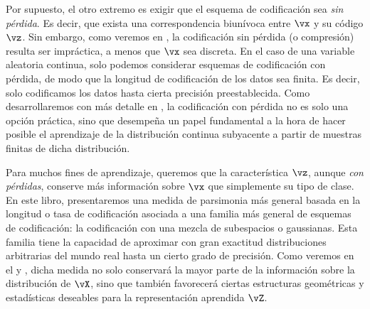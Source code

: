 \documentclass[../../book-main_es.tex]{subfiles}
\begin{document}
Por supuesto, el otro extremo es exigir que el esquema de codificación sea
\textit{sin pérdida}. Es decir, que exista una correspondencia biunívoca entre
\(\vx\) y su código \(\vz\). Sin embargo, como veremos en
, la codificación sin pérdida (o compresión) resulta
ser impráctica, a menos que \(\vx\) sea discreta. En el caso de una variable aleatoria continua,
solo podemos considerar esquemas de codificación con pérdida, de modo que
la longitud de codificación de los datos sea finita. Es decir, solo codificamos los
datos hasta cierta precisión preestablecida. Como desarrollaremos con más detalle
en , la codificación con pérdida no es solo una
opción práctica, sino que desempeña un papel fundamental a la hora de hacer 
posible el aprendizaje de la distribución continua subyacente a partir de 
muestras finitas de dicha distribución.

Para muchos fines de aprendizaje, queremos que la característica \(\vz\), aunque
\textit{con pérdidas}, conserve más información sobre \(\vx\) que simplemente
su tipo de clase. En este libro, presentaremos una medida de parsimonia más general
basada en la longitud o tasa de codificación asociada a una
familia más general de esquemas de codificación: la codificación con una mezcla de
subespacios o gaussianas. Esta familia tiene la capacidad de aproximar con gran exactitud 
distribuciones arbitrarias del mundo real hasta un cierto
grado de precisión. Como veremos en el  y
, dicha medida no solo conservará la mayor parte
de la información sobre la distribución de \(\vX\), sino que también favorecerá
ciertas estructuras geométricas y estadísticas deseables para la
representación aprendida \(\vZ\).
\end{document}
